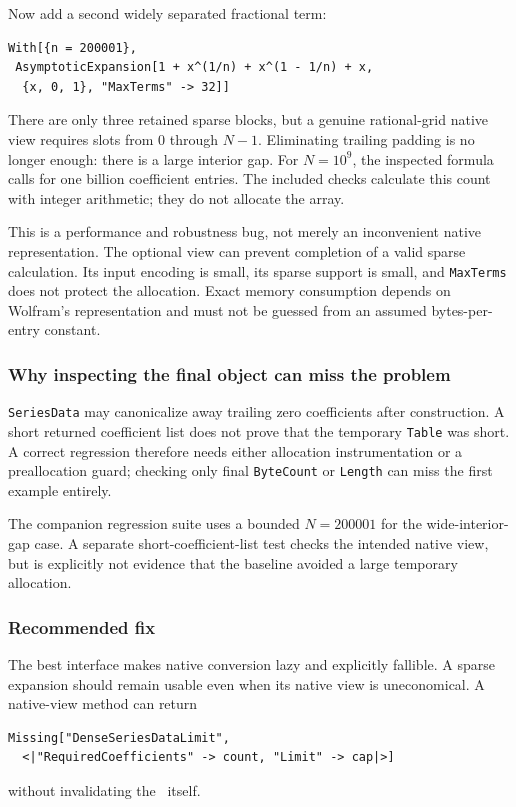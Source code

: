 Now add a second widely separated fractional term:
\begin{lstlisting}
With[{n = 200001},
 AsymptoticExpansion[1 + x^(1/n) + x^(1 - 1/n) + x,
  {x, 0, 1}, "MaxTerms" -> 32]]
\end{lstlisting}
There are only three retained sparse blocks, but a genuine rational-grid native view requires slots from 0 through $N-1$. Eliminating trailing padding is no longer enough: there is a large interior gap. For $N=10^9$, the inspected formula calls for one billion coefficient entries. The included checks calculate this count with integer arithmetic; they do not allocate the array.

This is a performance and robustness bug, not merely an inconvenient native representation. The optional view can prevent completion of a valid sparse calculation. Its input encoding is small, its sparse support is small, and \texttt{MaxTerms} does not protect the allocation. Exact memory consumption depends on Wolfram's representation and must not be guessed from an assumed bytes-per-entry constant.

\subsubsection*{Why inspecting the final object can miss the problem}

\texttt{SeriesData} may canonicalize away trailing zero coefficients after construction. A short returned coefficient list does not prove that the temporary \texttt{Table} was short. A correct regression therefore needs either allocation instrumentation or a preallocation guard; checking only final \texttt{ByteCount} or \texttt{Length} can miss the first example entirely.

The companion regression suite uses a bounded $N=200001$ for the wide-interior-gap case. A separate short-coefficient-list test checks the intended native view, but is explicitly not evidence that the baseline avoided a large temporary allocation.

\subsubsection*{Recommended fix}

The best interface makes native conversion lazy and explicitly fallible. A sparse expansion should remain usable even when its native view is uneconomical. A native-view method can return
\begin{lstlisting}
Missing["DenseSeriesDataLimit",
  <|"RequiredCoefficients" -> count, "Limit" -> cap|>]
\end{lstlisting}
without invalidating the \gseries\ itself.

